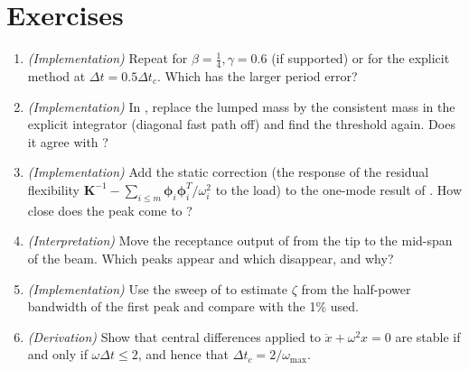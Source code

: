 \section*{Exercises}\label{sec:dy-exercises}
\begin{enumerate}
\item \emph{(Implementation)} Repeat  for $\beta=\tfrac14,\gamma=0.6$ (if supported) or for the explicit method at $\Delta t=0.5\Delta t_c$. Which has the larger period error?
\item \emph{(Implementation)} In , replace the lumped mass by the consistent mass in the explicit integrator (diagonal fast path off) and find the threshold again. Does it agree with ?
\item \emph{(Implementation)} Add the static correction (the response of the residual flexibility $\bm K^{-1}-\sum_{i\le m}\bm\phi_i\bm\phi_i^T/\omega_i^2$ to the load) to the one-mode result of . How close does the peak come to \cdyPeakAll{}?
\item \emph{(Interpretation)} Move the receptance output of  from the tip to the mid-span of the beam. Which peaks appear and which disappear, and why?
\item \emph{(Implementation)} Use the sweep of  to estimate $\zeta$ from the half-power bandwidth of the first peak and compare with the 1\% used.
\item \emph{(Derivation)} Show that central differences applied to $\ddot x+\omega^2x=0$ are stable if and only if $\omega\Delta t\le2$, and hence that $\Delta t_c=2/\omega_{\max}$.
\end{enumerate}

\chapterrefs
